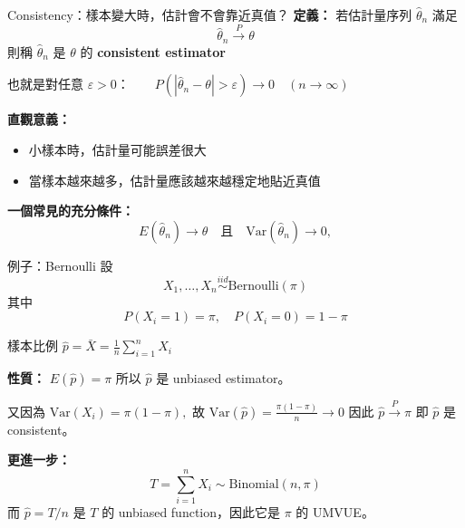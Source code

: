 \documentclass[aspectratio=169,12pt]{beamer}
\begin{document}

\begin{frame}{Consistency：樣本變大時，估計會不會靠近真值？}
    \textbf{定義：}
    若估計量序列 $\hat{\theta}_n$ 滿足 $$\hat{\theta}_n \xrightarrow{P} \theta$$
    則稱 $\hat{\theta}_n$ 是 $\theta$ 的 \textbf{consistent estimator}

    \vspace{0.8em}
    也就是對任意 $\varepsilon>0$：$\qquad P(|\hat{\theta}_n-\theta|>\varepsilon)\to 0\quad (n\to\infty)$

    \vspace{0.8em}
    \textbf{直觀意義：}
    \begin{itemize}
        \item 小樣本時，估計量可能誤差很大
        \item 當樣本越來越多，估計量應該越來越穩定地貼近真值
    \end{itemize}

    \vspace{0.8em}
    \textbf{一個常見的充分條件：}
    \vspace{-1.25em}
    $$E(\hat{\theta}_n)\to \theta\quad\text{且}\quad\mathrm{Var}(\hat{\theta}_n)\to 0,$$
\end{frame}

\begin{frame}{例子：Bernoulli}
設 $$X_1, \dots,X_n \overset{iid}{\sim}\mathrm{Bernoulli}(\pi)$$
其中 $$P(X_i=1)=\pi, \quad P(X_i=0)=1-\pi$$

樣本比例 $\hat p=\bar X=\frac1n\sum_{i=1}^n X_i$

\vspace{0.5em}
\textbf{性質：}
$
E(\hat p)=\pi
$
所以 $\hat p$ 是 unbiased estimator。

又因為
$
\mathrm{Var}(X_i)=\pi(1-\pi),
$
故
$
\mathrm{Var}(\hat p)=\frac{\pi(1-\pi)}{n}\to 0
$
因此
$
\hat p \xrightarrow{P} \pi
$
即 $\hat p$ 是 consistent。

\vspace{0.8em}
\textbf{更進一步：}
$$
T=\sum_{i=1}^n X_i \sim \mathrm{Binomial}(n, \pi)
$$
而 $\hat p=T/n$ 是 $T$ 的 unbiased function，因此它是 $\pi$ 的 UMVUE。
\end{frame}
\end{document}
